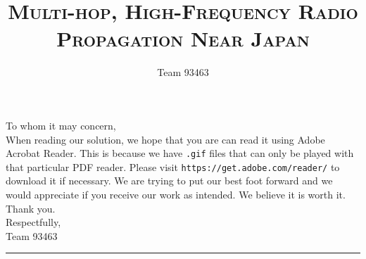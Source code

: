 \documentclass[11pt]{article}
\title{
    \textsc{{Multi-hop, High-Frequency Radio Propagation Near Japan}}
    }
\author{\Large Team 93463}
\date{\empty}
\numberwithin{equation}{section}
\begin{document}
    \singlespacing %
    \clearpage 
    \maketitle
    \thispagestyle{fancy} %

    \noindent To whom it may concern, \vspace{4pt}\\
    \indent When reading our solution, we hope that you are can read it using Adobe Acrobat Reader. This is because we have \texttt{.gif} files that can only be played with that particular PDF reader. Please visit \texttt{https://get.adobe.com/reader/} to download it if necessary. We are trying to put our best foot forward and we would appreciate if you receive our work as intended. We believe it is worth it. Thank you.
    \vspace{4pt} \\ 
    Respectfully,\vspace{3pt}\\
    \indent Team 93463
    \begin{center}
        \rule{12cm}{0.4pt}  
    \end{center} 
\end{document}
